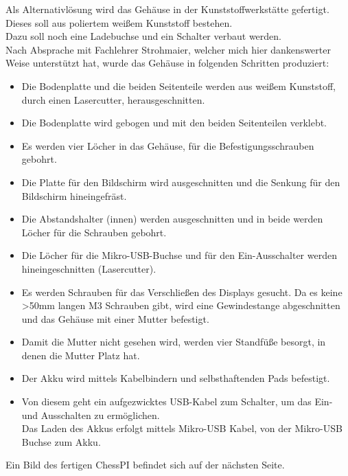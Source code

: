 \documentclass[12pt,a4paper]{article}
\begin{document}
Als Alternativlösung wird das Gehäuse in der Kunststoffwerkstätte gefertigt. Dieses soll aus poliertem weißem Kunststoff bestehen. \\
Dazu soll noch eine Ladebuchse und ein Schalter verbaut werden. \\
Nach Absprache mit Fachlehrer Strohmaier, welcher mich hier dankenswerter Weise unterstützt hat, wurde das Gehäuse in folgenden Schritten produziert:
\begin{itemize}
	\item{Die Bodenplatte und die beiden Seitenteile werden aus weißem Kunststoff, durch einen Lasercutter, herausgeschnitten.}
	\item{Die Bodenplatte wird gebogen und mit den beiden Seitenteilen verklebt.}
	\item{Es werden vier Löcher in das Gehäuse, für die Befestigungsschrauben gebohrt.}
	\item{Die Platte für den Bildschirm wird ausgeschnitten und die Senkung für den Bildschirm hineingefräst.}
	\item{Die Abstandshalter (innen) werden ausgeschnitten und in beide werden Löcher für die Schrauben gebohrt.}
	\item{Die Löcher für die Mikro-USB-Buchse und für den Ein-Ausschalter werden hineingeschnitten (Lasercutter).}
	\item{Es werden Schrauben für das Verschließen des Displays gesucht. Da es keine >50mm langen M3 Schrauben gibt, wird eine Gewindestange abgeschnitten und das Gehäuse mit einer Mutter befestigt.}
	\item{Damit die Mutter nicht gesehen wird, werden vier Standfüße besorgt, in denen die Mutter Platz hat.}
	\item{Der Akku wird mittels Kabelbindern und selbsthaftenden Pads befestigt.}
	\item{Von diesem geht ein aufgezwicktes USB-Kabel zum Schalter, um das Ein- und Ausschalten zu ermöglichen. \\
Das Laden des Akkus erfolgt mittels Mikro-USB Kabel, von der Mikro-USB Buchse zum Akku.}
\end{itemize}
 
Ein Bild des fertigen ChessPI befindet sich auf der nächsten Seite.

\newpage
\end{document}
